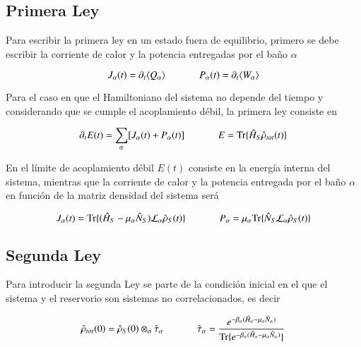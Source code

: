 \subsection{Primera Ley}
Para escribir la primera ley en un estado fuera de equilibrio, primero se debe escribir la corriente de calor y la potencia entregadas por el baño $\alpha$

\begin{equation*}
    J_{\alpha}(t) = \partial_{t}\langle Q_{\alpha}\rangle \hspace{12mm}  P_{\alpha}(t) = \partial_{t}\langle W_{\alpha}\rangle
\end{equation*}

Para el caso en que el Hamiltoniano del sistema no depende del tiempo y considerando que se cumple el acoplamiento débil, la primera ley consiste en

\begin{equation*}
    \partial_{t}E(t) = \sum_{\alpha}[J_{\alpha}(t) + P_{\alpha}(t) ] \hspace{12mm} E = \text{Tr}\{\hat{H}_{S}\hat{\rho}_{tot}(t) \}
\end{equation*}

En el límite de acoplamiento débil $E(t)$ consiste en la energía interna del sistema, mientras que la corriente de calor y la potencia entregada por el baño $\alpha$ en función de la matriz densidad del sistema será 

\begin{equation*}
    J_{\alpha}(t) = \text{Tr}\{(\hat{H}_{S} - \mu_{\alpha}\hat{N}_S)\mathcal{L}_{\alpha}\hat{\rho}_{S}(t) \} \hspace{12mm} P_{\alpha} = \mu_{\alpha} \text{Tr}\{\hat{N}_{S}\mathcal{L}_{\alpha}\hat{\rho}_{S}(t) \} 
\end{equation*}

\subsection{Segunda Ley}
Para introducir la segunda Ley se parte de la condición inicial en el que el sistema y el reservorio son sistemas no correlacionados, es decir 

\begin{equation*}
    \hat{\rho}_{tot}(0) = \hat{\rho}_{S}(0)\otimes_{\alpha}\hat{\tau}_{\alpha} \hspace{12mm} \hat{\tau}_{\alpha} = \frac{e^{-\beta_{\alpha}(\hat{H}_{\alpha}-\mu_{\alpha}\hat{N}_{\alpha}) }}{ \text{Tr}\{e^{-\beta_{\alpha}(\hat{H}_{\alpha} - \mu_{\alpha}\hat{N}_{\alpha})}\} }
\end{equation*}

